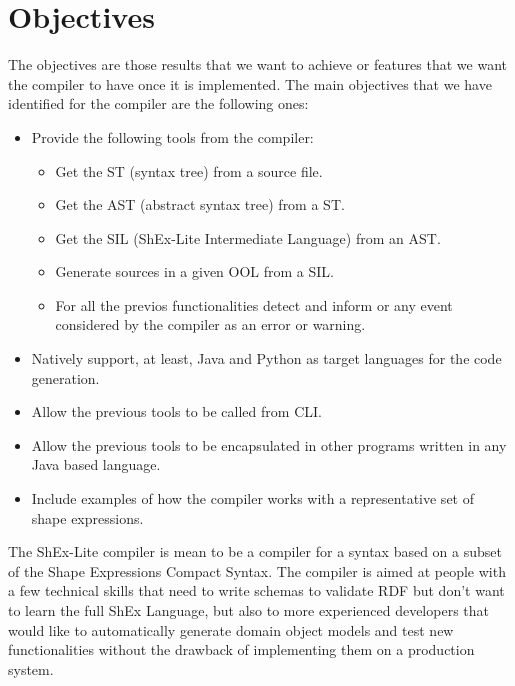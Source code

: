\section{Objectives}

The objectives are those results that we want to achieve or features that we want the compiler to have once it is implemented. The main objectives that we have identified for the compiler are the following ones:
\begin{itemize}
    \item Provide the following tools from the compiler:
    \begin{itemize}
        \item Get the ST (syntax tree) from a source file.
        \item Get the AST (abstract syntax tree) from a ST.
        \item Get the SIL (ShEx-Lite Intermediate Language) from an AST.
        \item Generate sources in a given OOL from a SIL.
        \item For all the previos functionalities detect and inform or any event considered by the compiler as an error or warning.
    \end{itemize}
    \item Natively support, at least, Java and Python as target languages for the code generation.
    \item Allow the previous tools to be called from CLI.
    \item Allow the previous tools to be encapsulated in other programs written in any Java based language.
    \item Include examples of how the compiler works with a representative set of shape expressions.
\end{itemize}

The ShEx-Lite compiler is mean to be a compiler for a syntax based on a subset of the Shape Expressions Compact Syntax. The compiler is aimed at people with a few technical skills that need to write schemas to validate RDF but don’t want to learn the full ShEx Language, but also to more experienced developers that would like to automatically generate domain object models and test new functionalities without the drawback of implementing them on a production system.